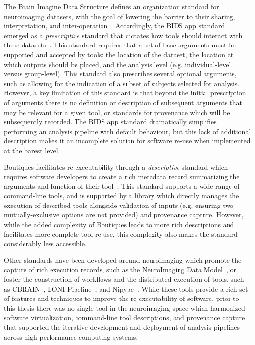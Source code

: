 The Brain Imagine Data Structure defines an organization standard for neuroimaging datasets, with the goal of lowering
the barrier to their sharing, interpretation, and inter-operation~\cite{gorgolewski2016brain}. Accordingly, the BIDS
app standard emerged as a \textit{prescriptive} standard that dictates how tools should interact with these
datasets~\cite{gorgolewski2017bids}. This standard requires that a set of base arguments must be supported and accepted
by tools: the location of the dataset, the location at which outputs should be placed, and the analysis level (e.g.
individual-level versus group-level). This standard also prescribes several optional arguments, such as allowing for
the indication of a subset of subjects selected for analysis. However, a key limitation of this standard is that beyond
the initial prescription of arguments there is no definition or description of subsequent arguments that may be
relevant for a given tool, or standards for provenance which will be subsequently recorded. The BIDS app standard
dramatically simplifies performing an analysis pipeline with default behaviour, but this lack of additional description
makes it an incomplete solution for software re-use when implemented at the barest level.

Boutiques facilitates re-executability through a \textit{descriptive} standard which requires software developers to
create a rich metadata record summarizing the arguments and function of their tool~\cite{Glatard2018-tu}. This standard
supports a wide range of command-line tools, and is supported by a library which directly manages the execution of
described tools alongside validation of inputs (e.g. ensuring two mutually-exclusive options are not provided) and
provenance capture. However, while the added complexity of Boutiques leads to more rich descriptions and facilitates
more complete tool re-use, this complexity also makes the standard considerably less accessible.

Other standards have been developed around neuroimaging which promote the capture of rich execution records, such as
the NeuroImaging Data Model~\cite{maumet2016sharing}, or foster the construction of workflows and the distributed
execution of tools, such as CBRAIN~\cite{maumet2016sharing}, LONI Pipeline~\cite{rex2003loni}, and
Nipype~\cite{gorgolewski2011nipype}. While these tools provide a rich set of features and techniques to improve the
re-executability of software, prior to this thesis there was no single tool in the neuroimaging space which harmonized
software virtualization, command-line tool descriptions, and provenance capture that supported the iterative
development and deployment of analysis pipelines across high performance computing systems.

